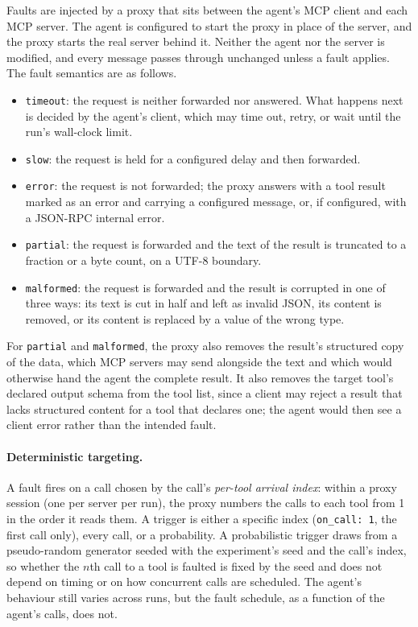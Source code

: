 Faults are injected by a proxy that sits between the agent's MCP client and each MCP server. The agent is configured to start the proxy in place of the server, and the proxy starts the real server behind it. Neither the agent nor the server is modified, and every message passes through unchanged unless a fault applies. The fault semantics are as follows.
\begin{itemize}
\item \texttt{timeout}: the request is neither forwarded nor answered. What happens next is decided by the agent's client, which may time out, retry, or wait until the run's wall-clock limit.
\item \texttt{slow}: the request is held for a configured delay and then forwarded.
\item \texttt{error}: the request is not forwarded; the proxy answers with a tool result marked as an error and carrying a configured message, or, if configured, with a JSON-RPC internal error.
\item \texttt{partial}: the request is forwarded and the text of the result is truncated to a fraction or a byte count, on a UTF-8 boundary.
\item \texttt{malformed}: the request is forwarded and the result is corrupted in one of three ways: its text is cut in half and left as invalid JSON, its content is removed, or its content is replaced by a value of the wrong type.
\end{itemize}
For \texttt{partial} and \texttt{malformed}, the proxy also removes the result's structured copy of the data, which MCP servers may send alongside the text and which would otherwise hand the agent the complete result. It also removes the target tool's declared output schema from the tool list, since a client may reject a result that lacks structured content for a tool that declares one; the agent would then see a client error rather than the intended fault.

\paragraph{Deterministic targeting.} A fault fires on a call chosen by the call's \emph{per-tool arrival index}: within a proxy session (one per server per run), the proxy numbers the calls to each tool from 1 in the order it reads them. A trigger is either a specific index (\texttt{on\_call: 1}, the first call only), every call, or a probability. A probabilistic trigger draws from a pseudo-random generator seeded with the experiment's seed and the call's index, so whether the $n$th call to a tool is faulted is fixed by the seed and does not depend on timing or on how concurrent calls are scheduled. The agent's behaviour still varies across runs, but the fault schedule, as a function of the agent's calls, does not.

